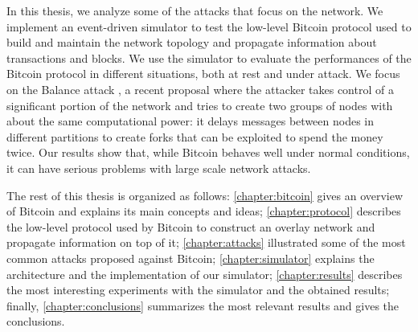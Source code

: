 In this thesis, we analyze some of the attacks that focus on the network.
We implement an event-driven simulator to test the low-level Bitcoin protocol used to build and maintain the network topology and propagate information about transactions and blocks.
We use the simulator to evaluate the performances of the Bitcoin protocol in different situations, both at rest and under attack.
We focus on the Balance attack \cite{balance_attack_2017, balance_attack_report_2016}, a recent proposal where the attacker takes control of a significant portion of the network and tries to create two groups of nodes with about the same computational power:
it delays messages between nodes in different partitions to create forks that can be exploited to spend the money twice.
Our results show that, while Bitcoin behaves well under normal conditions, it can have serious problems with large scale network attacks.

\bigskip
The rest of this thesis is organized as follows:
\cref{chapter:bitcoin} gives an overview of Bitcoin and explains its main concepts and ideas;
\cref{chapter:protocol} describes the low-level protocol used by Bitcoin to construct an overlay network and propagate information on top of it;
\cref{chapter:attacks} illustrated some of the most common attacks proposed against Bitcoin;
\cref{chapter:simulator} explains the architecture and the implementation of our simulator;
\cref{chapter:results} describes the most interesting experiments with the simulator and the obtained results;
finally, \cref{chapter:conclusions} summarizes the most relevant results and gives the conclusions.
